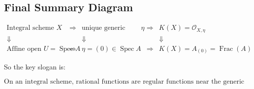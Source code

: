 \documentclass[12pt,a4paper]{article}
\theoremstyle{notespace}
\begin{document}
\subsection{Final Summary Diagram}

\[
\begin{array}{ccccc}
	\text{Integral scheme } X
	& \Longrightarrow &
	\text{unique generic point } \eta
	& \Longrightarrow &
	K(X)=\mathcal{O}_{X,\eta}
	\\[1em]
	\Downarrow
	& &
	\Downarrow
	& &
	\Downarrow
	\\[1em]
	\text{Affine open } U=\operatorname{Spec}A
	& \Longrightarrow &
	\eta=(0)\in \operatorname{Spec}A
	& \Longrightarrow &
	K(X)=A_{(0)}=\operatorname{Frac}(A)
\end{array}
\]

So the key slogan is:

\[
\boxed{
	\text{On an integral scheme, rational functions are regular functions near the generic point.}
}
\]
\end{document}
